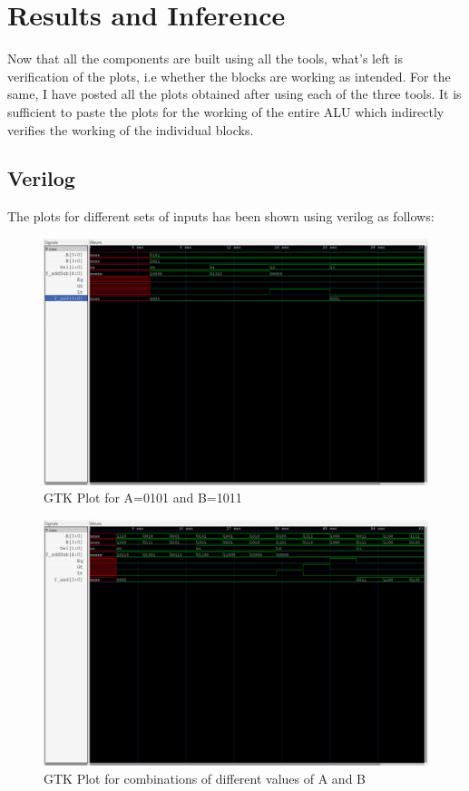 \documentclass[a4paper, titlepage]{article}
\begin{document}
\section{Results and Inference}
Now that all the components are built using all the tools, what's left is verification of the plots, i.e whether 
the blocks are working as intended. For the same, I have posted all the plots obtained after using each of the three 
tools. It is sufficient to paste the plots for the working of the entire ALU which indirectly verifies the working 
of the individual blocks.
\subsection{Verilog}
The plots for different sets of inputs has been shown using verilog as follows:
\begin{figure}[htp]
    \centering
    \hypertarget{GTK1}{\includegraphics[scale = 0.3]{ALU_Outputs_1_sample.png}}
    \caption{GTK Plot for A=0101 and B=1011}
    \label{fig:fig10}
\end{figure}
\begin{figure}[htp]
    \centering
    \hypertarget{GTK12}{\includegraphics[scale = 0.3]{ALU_Outputs_12_samples.png}}
    \caption{GTK Plot for combinations of different values of A and B}
    \label{fig:fig11}
\end{figure}
\end{document}
